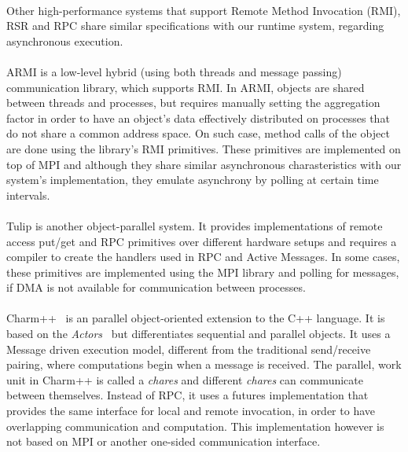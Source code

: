 \paragraph{}
Other high-performance systems that support Remote Method Invocation (RMI), RSR and RPC share similar specifications
with our runtime system, regarding asynchronous execution.

\paragraph{}
ARMI\cite{Saunders:2003:AAP:966049.781534} is a low-level hybrid (using both threads and message passing) communication library, 
which supports RMI.  In ARMI, objects are shared between threads and processes, but requires manually setting the aggregation
factor in order to have an object's data effectively distributed on processes that do not share a common address space.  On such
case, method calls of the object are done using the library's RMI primitives.  These primitives are implemented on top of MPI and
although they share similar asynchronous charasteristics with our system's implementation, they emulate asynchrony by polling 
at certain time intervals.

\paragraph{}
Tulip\cite{Beckman96tulip:a} is another object-parallel system.  It provides implementations of remote access put/get and RPC 
primitives
over different hardware setups and requires a compiler to create the handlers used in RPC and Active Messages.  In some cases, 
these primitives are implemented using the MPI library and polling for messages, if DMA is not available for communication
between processes.

\paragraph{}
Charm++~\cite{Kale93charm++:a} is an parallel object-oriented extension to the C++ language.  It is based on the 
\emph{Actors}~\cite{} but differentiates sequential and parallel objects.  It uses a Message driven execution model,
different from the traditional send/receive pairing, where computations begin when a message is received.  The parallel,
work unit in Charm++ is called a \emph{chares} and different \emph{chares} can communicate between themselves.  Instead
of RPC, it uses a futures implementation that provides the same interface for local and remote invocation, in order to have overlapping communication and computation.  This implementation however is not based on MPI or another one-sided 
communication interface.

